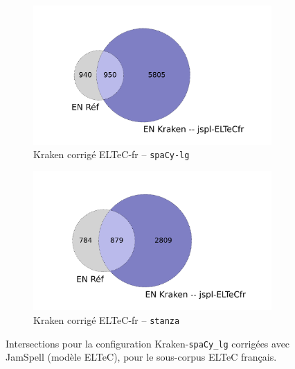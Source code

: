 \begin{figure}[h!]
\begin{minipage}{7cm}
\begin{subfigure}{1\textwidth}
  \includegraphics[width=1\textwidth]{IMAGES/INTERSECTIONS_GLOBALES/ELTeCFRA_Kraken -- jspl-ELTeCfr_spacy-lg-concat_intersection.png} 
  \caption{Kraken corrigé ELTeC-fr -- \texttt{spaCy-lg}}
  \label{fig:ELTeCFRA_Kraken -- jspl-ELTeCfr_spacy-lg-concat_intersection}
  \end{subfigure}
  \end{minipage}
  \begin{minipage}{7cm}
  \begin{subfigure}{1\textwidth}
  \includegraphics[width=1\textwidth]{IMAGES/INTERSECTIONS_GLOBALES/ELTeCFRA_Kraken -- jspl-ELTeCFR_stanza-concat_intersection.png}
  \caption{Kraken corrigé ELTeC-fr -- \texttt{stanza}}
  \label{fig:ELTeCFRA_Kraken -- jspl-ELTeCFR_stanza-concat_intersection}
  \end{subfigure}
    \end{minipage}
\caption{Intersections pour la configuration Kraken-\texttt{spaCy\_lg} corrigées avec JamSpell (modèle ELTeC), pour le sous-corpus ELTeC français.}
\label{fig:intersection_globale-kraken}
\end{figure}


